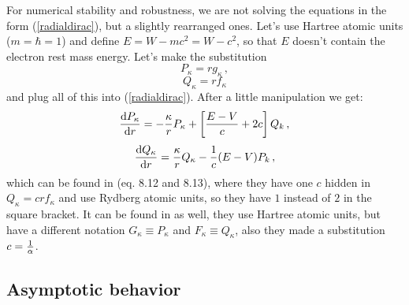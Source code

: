 For numerical stability and robustness, we are not solving the equations in the form (\ref{radialdirac}), but a slightly rearranged ones. Let's use Hartree atomic units ($m=\hbar=1$) and define $E=W-mc^2=W-c^2$, so that $E$ doesn't contain the electron rest mass energy. Let's make the substitution \cite{donald:apw} 
\begin{equation*}
  P_\kappa=rg_\kappa\,,
\end{equation*}
\begin{equation*}
  Q_\kappa=rf_\kappa
\end{equation*}
and plug all of this into (\ref{radialdirac}). After a little manipulation we get: 
\begin{equation*}
  {{\rm d}P_\kappa\over{\rm d}r}=-{\kappa\over r}P_\kappa+\left[{E-V\over c}+2c\right]Q_k\,,
\end{equation*}
\begin{equation}
  {{\rm d}Q_\kappa\over{\rm d}r}={\kappa\over r}Q_\kappa-{1\over c}(E-V)P_k\,,  \label{radialdirac2}
\end{equation}
which can be found in \cite{zabloudil} (eq. 8.12 and 8.13), where they have one $c$ hidden in $Q_\kappa=crf_\kappa$ and use Rydberg atomic units, so they have $1$ instead of $2$ in the square bracket. It can be found in \cite{bachelet} as well, they use Hartree atomic units, but have a different notation $G_\kappa\equiv P_\kappa$ and $F_\kappa\equiv Q_\kappa$, also they made a substitution $c={1\over\alpha}$.

\subsection{Asymptotic behavior}


